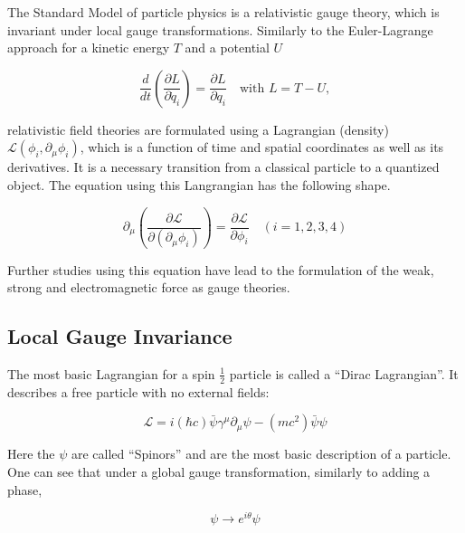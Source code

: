 The Standard Model of particle physics is a relativistic gauge theory, which is invariant under local gauge transformations. Similarly to the Euler-Lagrange approach for a kinetic energy $T$ and a potential $U$

\begin{equation}
  \label{eq:eulerlagrange}
  \frac{d}{dt} \left( \frac{\partial L}{\partial \dot{q}_i} \right) =  \frac{\partial L}{\partial q_i} \quad \text{with } L = T - U,
\end{equation}

\noindent relativistic field theories are formulated using a Lagrangian (density) $\mathcal{L} ( \phi_i, \partial_\mu \phi_i )$, which is a function of time and spatial coordinates as well as its derivatives. It is a necessary transition from a classical particle to a quantized object. The equation using this Langrangian has the following shape.

\begin{equation}
  \label{eq:lagrangian}
  \partial_\mu \left( \frac{\partial \mathcal{L}}{\partial (\partial_\mu \phi_i)} \right) = \frac{\partial \mathcal{L}}{\partial \phi_i} \quad (i = 1, 2, 3, 4)
\end{equation}

Further studies using this equation have lead to the formulation of the weak, strong and electromagnetic force as gauge theories. 

\subsection{Local Gauge Invariance}

The most basic Lagrangian for a spin $\frac{1}{2}$ particle is called a ``Dirac Lagrangian''. It describes a free particle with no external fields:

\begin{equation}
  \label{eq:diraclagrangian}
  \mathcal{L} = i (\hbar c) \bar{\psi} \gamma^\mu \partial_\mu \psi - (m c^2) \bar{\psi} \psi
\end{equation}

\noindent Here the $\psi$ are called ``Spinors'' and are the most basic description of a particle. One can see that under a global gauge transformation, similarly to adding a phase,

\begin{equation}
  \label{eq:globalgaugeinv}
  \psi \rightarrow e^{i \theta} \psi
\end{equation}

